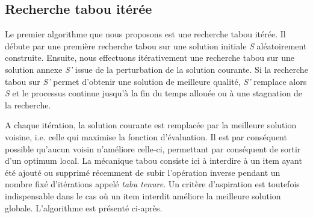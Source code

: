 \documentclass[a4paper,10pt]{report}
\begin{document}
\subsection{Recherche tabou itérée}

\hspace{1cm}Le premier algorithme que nous proposons est une recherche tabou itérée. Il débute par une première recherche tabou sur une solution initiale \emph{S} aléatoirement construite. Ensuite, nous effectuons itérativement une recherche tabou sur une solution annexe \emph{S'} issue de la perturbation de la solution courante. Si la recherche tabou sur \emph{S'} permet d'obtenir une solution de meilleure qualité, \emph{S'} remplace alors \emph{S} et le processus continue jusqu'à la fin du temps allouée ou à une stagnation de la recherche. \\

\begin{algorithm}[H]
\caption{Iterated Tabu Search}


\Output{ Pool de Solution 


\end{algorithm}



\hspace{1cm}A chaque itération, la solution courante est remplacée par la meilleure solution voisine, i.e. celle qui maximise la fonction d'évaluation. Il est par conséquent possible qu'aucun voisin n'améliore celle-ci, permettant par conséquent de sortir d'un optimum local. La mécanique tabou consiste ici à interdire à un item ayant été ajouté ou supprimé récemment de subir l'opération inverse pendant un nombre fixé d'itérations appelé \emph{tabu tenure}. Un critère d'aspiration est toutefois indispensable dans le cas où un item interdit améliore la meilleure solution globale. L'algorithme est présenté ci-après.
	
\end{document}
